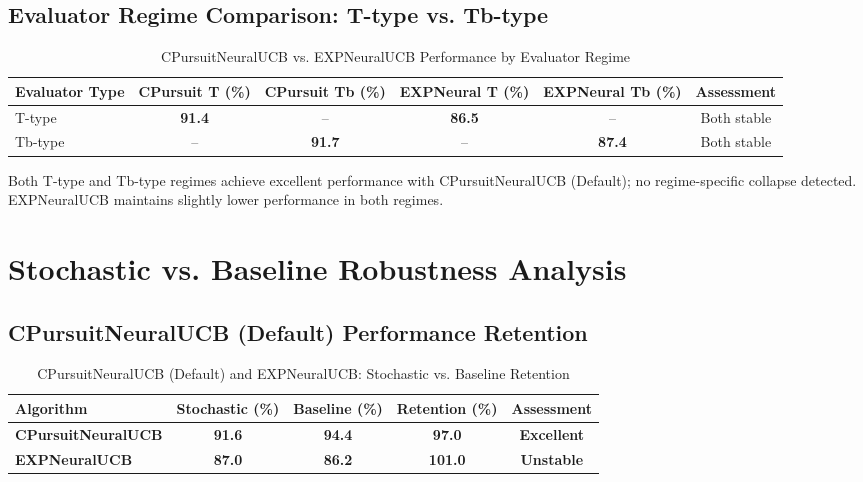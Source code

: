 \documentclass[12pt,a4paper]{article}
\newcommand{\success}[1]{\textcolor{accentgreen}{\textbf{#1}}}
\newcommand{\legacy}[1]{\textcolor{legacycolor}{\textbf{#1}}}
\begin{document}
\subsection{Evaluator Regime Comparison: T-type vs. Tb-type}

\begin{table}[H]
\centering
\caption{CPursuitNeuralUCB vs. EXPNeuralUCB Performance by Evaluator Regime}
\begin{tabular}{@{}lccccc@{}}
\toprule
\textbf{Evaluator Type} & \textbf{CPursuit T (\%)} & \textbf{CPursuit Tb (\%)} & \textbf{EXPNeural T (\%)} & \textbf{EXPNeural Tb (\%)} & \textbf{Assessment} \\
\midrule
T-type & \success{91.4} & -- & \legacy{86.5} & -- & Both stable \\
Tb-type & -- & \success{91.7} & -- & \legacy{87.4} & Both stable \\
\bottomrule
\end{tabular}
\end{table}

Both T-type and Tb-type regimes achieve excellent performance with CPursuitNeuralUCB (Default); no regime-specific collapse detected. EXPNeuralUCB maintains slightly lower performance in both regimes.

\section{Stochastic vs. Baseline Robustness Analysis}

\subsection{CPursuitNeuralUCB (Default) Performance Retention}

\begin{table}[H]
\centering
\caption{CPursuitNeuralUCB (Default) and EXPNeuralUCB: Stochastic vs. Baseline Retention}
\begin{tabular}{@{}lcccc@{}}
\toprule
\textbf{Algorithm} & \textbf{Stochastic (\%)} & \textbf{Baseline (\%)} & \textbf{Retention (\%)} & \textbf{Assessment} \\
\midrule
\success{CPursuitNeuralUCB} & \success{91.6} & \success{94.4} & \success{97.0} & \success{Excellent} \\
\legacy{EXPNeuralUCB} & \legacy{87.0} & \legacy{86.2} & \legacy{101.0} & \legacy{Unstable} \\
\bottomrule
\end{tabular}
\end{table}
\end{document}

